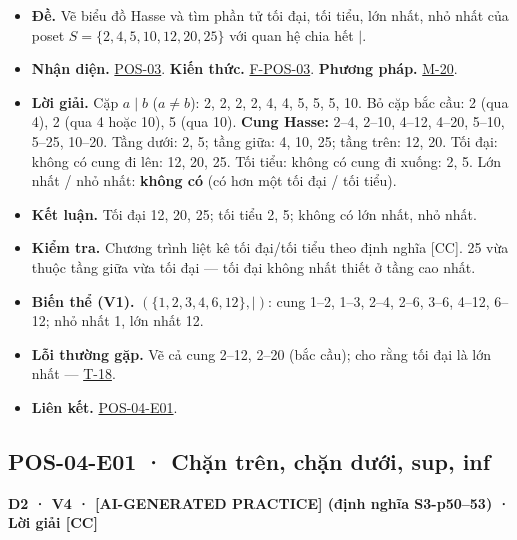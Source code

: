 \documentclass[
  10pt,
  twoside,openany]{book}
\providecommand{\tightlist}{%
  \setlength{\itemsep}{0pt}\setlength{\parskip}{0pt}}
\begin{document}
\begin{itemize}
\tightlist
\item
  \textbf{Đề.} Vẽ biểu đồ Hasse và tìm phần tử tối đại, tối tiểu, lớn
  nhất, nhỏ nhất của poset \(S=\{2,4,5,10,12,20,25\}\) với quan hệ chia
  hết \(\mid\).
\item
  \textbf{Nhận diện.} \protect\hyperlink{POS-03}{POS-03}. \textbf{Kiến
  thức.} \protect\hyperlink{F-POS-03}{F-POS-03}. \textbf{Phương pháp.}
  \protect\hyperlink{M-20}{M-20}.
\item
  \textbf{Lời giải.} Cặp \(a\mid b\) (\(a\ne b\)): 2,
  2, 2, 2, 4, 4,
  5, 5, 5, 10. Bỏ cặp bắc cầu:
  2 (qua 4), 2 (qua 4 hoặc 10), 5 (qua
  10). \textbf{Cung Hasse:} 2--4, 2--10, 4--12, 4--20, 5--10, 5--25,
  10--20. Tầng dưới: 2, 5; tầng giữa: 4, 10, 25; tầng trên: 12, 20. Tối
  đại: không có cung đi lên: 12, 20, 25. Tối tiểu: không có cung đi
  xuống: 2, 5. Lớn nhất / nhỏ nhất: \textbf{không có} (có hơn một tối
  đại / tối tiểu).
\item
  \textbf{Kết luận.} Tối đại 12, 20, 25; tối tiểu 2, 5; không có lớn
  nhất, nhỏ nhất.
\item
  \textbf{Kiểm tra.} Chương trình liệt kê tối đại/tối tiểu theo định
  nghĩa {[}CC{]}. 25 vừa thuộc tầng giữa vừa tối đại --- tối đại không
  nhất thiết ở tầng cao nhất.
\item
  \textbf{Biến thể (V1).} \((\{1,2,3,4,6,12\},\mid)\): cung 1--2, 1--3,
  2--4, 2--6, 3--6, 4--12, 6--12; nhỏ nhất 1, lớn nhất 12.
\item
  \textbf{Lỗi thường gặp.} Vẽ cả cung 2--12, 2--20 (bắc cầu); cho rằng
  tối đại là lớn nhất --- \protect\hyperlink{T-18}{T-18}.
\item
  \textbf{Liên kết.} \protect\hyperlink{POS-04-E01}{POS-04-E01}.
\end{itemize}

\hypertarget{POS-04-E01}{%
\subsection{POS-04-E01 · Chặn trên, chặn dưới, sup,
inf}\label{POS-04-E01}}

\textbf{D2 · V4 · {[}AI-GENERATED PRACTICE{]} (định nghĩa S3-p50--53) ·
Lời giải {[}CC{]}}
\end{document}
